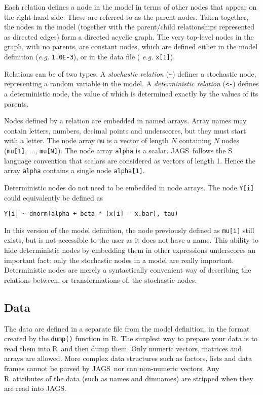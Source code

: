 \documentclass[11pt, a4paper, titlepage]{report}
\newcommand{\JAGS}{\textsf{JAGS}}
\newcommand{\R}{\textsf{R}}
\begin{document}
Each relation defines a node in the model in terms of other nodes that
appear on the right hand side. These are referred to as the parent
nodes. Taken together, the nodes in the model (together with the
parent/child relationships represented as directed edges) form a
directed acyclic graph. The very top-level nodes in the graph, with no
parents, are constant nodes, which are defined either in the model
definition ({\em e.g.}  \verb+1.0E-3+), or in the data file ({\em
  e.g.}  \verb+x[1]+).

Relations can be of two types. A {\em stochastic relation} (\verb+~+)
defines a stochastic node, representing a random variable in the
model. A {\em deterministic relation} (\verb+<-+) defines a
deterministic node, the value of which is determined exactly by the
values of its parents.

Nodes defined by a relation are embedded in named arrays. Array names may
contain letters, numbers, decimal points and underscores, but they must
start with a letter.  The node array \verb+mu+ is a vector of length
$N$ containing $N$ nodes (\verb+mu[1]+, $\ldots$, \verb+mu[N]+). The
node array \verb+alpha+ is a scalar.  \JAGS\ follows the S language
convention that scalars are considered as vectors of length 1. Hence
the array \verb+alpha+ contains a single node \verb+alpha[1]+.

Deterministic nodes do not need to be embedded in node arrays. The
node \verb+Y[i]+ could equivalently be defined as
\begin{verbatim}
Y[i] ~ dnorm(alpha + beta * (x[i] - x.bar), tau)
\end{verbatim}
In this version of the model definition, the node previously defined
as \verb+mu[i]+ still exists, but is not accessible to the user as it
does not have a name.  This ability to hide deterministic nodes by
embedding them in other expressions underscores an important fact:
only the stochastic nodes in a model are really
important. Deterministic nodes are merely a syntactically convenient
way of describing the relations between, or transformations of, the
stochastic nodes.

\subsection{Data}
\label{section:data}

The data are defined in a separate file from the model definition, in
the format created by the \texttt{dump()} function in \R.  The
simplest way to prepare your data is to read them into \R\ and then
dump them.  Only numeric vectors, matrices and arrays are
allowed. More complex data structures such as factors, lists and data
frames cannot be parsed by \JAGS\, nor can non-numeric vectors.  Any
\R\ attributes of the data (such as names and dimnames) are stripped
when they are read into \JAGS.
\end{document}
